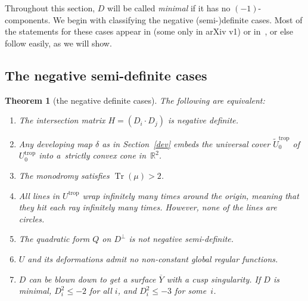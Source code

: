 \documentclass[pdftex]{sigma}
\numberwithin{equation}{section}
\numberwithin{figure}{section}
\numberwithin{table}{section}
\DeclareMathOperator{\Tr}{Tr}
\DeclareMathOperator{\trop}{trop}
\let\?=\overline
\let\bb=\mathbb
\let\wt=\widetilde
\newtheorem{thm}{Theorem}[section]
\theoremstyle{definition}
\begin{document}
Throughout this section, $D$ will be called {\it minimal} if it has no $(-1)$-components. We begin with classifying the negative (semi-)definite cases. Most of the statements for these cases appear in \cite{GHK1} (some only in arXiv v1) or in~\cite{GHK2}, or else follow easily, as we will show.

\subsection{The negative semi-definite cases}

\begin{thm}[the negative definite cases]\label{NegD}
The following are equivalent:
\begin{enumerate}\itemsep=0pt
\item[$1.$] The {intersection matrix} $H=(D_i \cdot D_j)$ is negative definite.
\item[$2.$] Any {developing map} $\delta$ as in Section~{\rm \ref{dev}} embeds the universal cover $\wt{U}_0^{\trop}$ of $U^{\trop}_0$ into a~strictly convex cone in~$\bb{R}^2$.
\item[$3.$] The {monodromy} satisfies $\Tr(\mu) > 2$.
\item[$4.$] All {lines} in $U^{\trop}$ wrap infinitely many times around the origin, meaning that they hit each ray infinitely many times. However, none of the lines are circles.
\item[$5.$] The {quadratic form} $Q$ on $D^{\perp}$ is not negative semi-definite.
\item[$6.$] $U$ and its deformations admit no non-constant global regular {functions}.
\item[$7.$] $D$ can be blown down to get a surface $\?{Y}$ with a cusp singularity. If $D$ is minimal, $D_i^2 \leq -2$ for all $i$, and $D_i^2 \leq -3$ for some~$i$.
\end{enumerate}
\end{thm}
\end{document}
